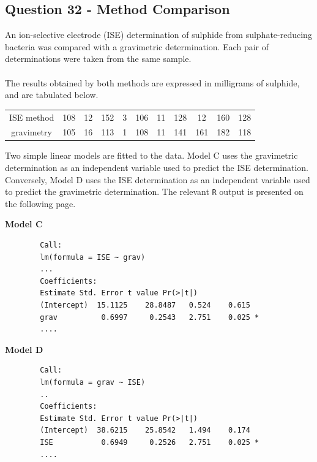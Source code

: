 \documentclass[a4paper,12pt]{article}
\begin{document}
	

\subsection*{Question 32 - Method Comparison}

An ion-selective electrode (ISE) determination of sulphide from sulphate-reducing bacteria was compared with a gravimetric determination. Each pair of determinations were taken from the same sample. \\ \\The results obtained by both methods are expressed in milligrams of sulphide, and are tabulated below.
\begin{center}
	\begin{tabular}{|c|cccccccccc|}
		\hline
		ISE method & 108 & 12& 152 & 3 & 106 & 11 &  128 & 12& 160& 128 \\
		gravimetry & 105 & 16& 113 & 1 & 108 &  11 & 141 & 161 & 182& 118\\
		\hline
	\end{tabular}
\end{center}
Two simple linear models are fitted to the data. Model C uses the gravimetric determination as an independent variable used to predict the ISE determination. Conversely, Model D uses the ISE determination as an independent variable used to predict the gravimetric determination. The relevant \texttt{R} output is presented on the following page.

\begin{itemize}
\end{itemize}
\end{document}
